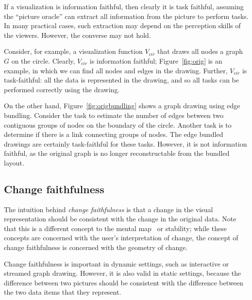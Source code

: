 \documentclass[10pt,journal,cspaper,compsoc]{IEEEtran}
\begin{document}
If a visualization is information faithful, then clearly it is task
faithful, assuming the “picture oracle” can extract
all information from the picture to perform tasks. In
many practical cases, such extraction may depend on the perception skills of the viewers.
However, the converse may not hold.

\begin{comment}
Consider, for example,
the visualization function \texttt{extractPlanar} above. Suppose that
the task $T$ is a boolean query that asks whether for every pair $a,
b$ of nodes, there is a path from $a$ to $b$. In this case,
\texttt{extractPlanar} is task faithful, because a maximal planar
subgraph of $G$ is connected if and only if $G$ is connected.
\end{comment}

Consider, for example, a visualization function $V_{cir}$ that draws all nodes a graph $G$ on the circle.
Clearly, $V_{cir}$ is information faithful; Figure~\ref{fig:orig} is an example, in which we can find all nodes and edges in the drawing. Further, $V_{cir}$ is task-faithful: all the data is represented in the drawing, and so all tasks can be performed correctly using the drawing.

On the other hand, Figure~\ref{fig:origbundling} shows a graph drawing using edge bundling. Consider the task to estimate the number of edges between two contiguous groups of nodes on the boundary of the circle. Another task is to determine
if there is a link connecting groups of nodes.
The edge bundled drawings are certainly task-faithful for these tasks. However, it is not information faithful, as the original graph is no longer reconstructable from the bundled layout.



\subsection{Change faithfulness}
The intuition behind \emph{change faithfulness} is that a change in
the visual representation should be consistent with the change in the
original data. Note that this is a different concept to the mental
map~\cite{peter1991mentalmap} or stability\cite{paulisch1990edge}; while these
concepts are concerned with the user's interpretation of change, the
concept of change faithfulness is concerned with the geometry of
change.

Change faithfulness is important in dynamic settings, such as interactive or streamed graph drawing. However, it is also valid in static settings, because the difference between two pictures should be consistent with the difference between the two data items that they represent.
\end{document}
